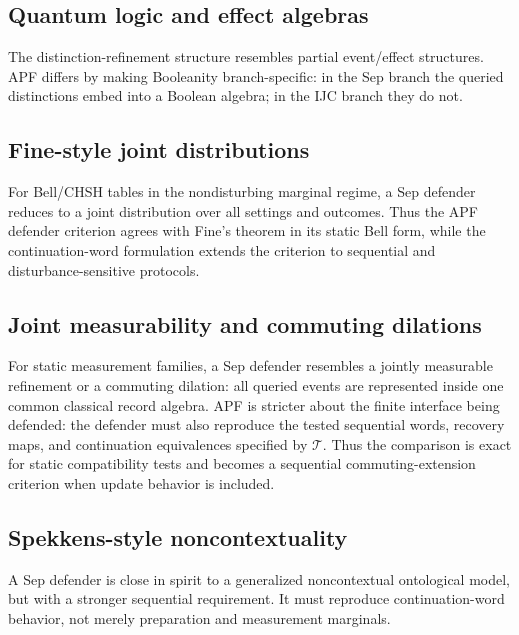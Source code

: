 \documentclass[11pt]{article}
\begin{document}
\subsection*{Quantum logic and effect algebras}
The distinction-refinement structure resembles partial event/effect structures.  APF differs by making Booleanity branch-specific: in the Sep branch the queried distinctions embed into a Boolean algebra; in the IJC branch they do not.

\subsection*{Fine-style joint distributions}
For Bell/CHSH tables in the nondisturbing marginal regime, a Sep defender reduces to a joint distribution over all settings and outcomes.  Thus the APF defender criterion agrees with Fine's theorem in its static Bell form, while the continuation-word formulation extends the criterion to sequential and disturbance-sensitive protocols.

\subsection*{Joint measurability and commuting dilations}
For static measurement families, a Sep defender resembles a jointly measurable refinement or a commuting dilation: all queried events are represented inside one common classical record algebra.  APF is stricter about the finite interface being defended: the defender must also reproduce the tested sequential words, recovery maps, and continuation equivalences specified by $\mathcal T$.  Thus the comparison is exact for static compatibility tests and becomes a sequential commuting-extension criterion when update behavior is included.

\subsection*{Spekkens-style noncontextuality}

A Sep defender is close in spirit to a generalized noncontextual ontological model, but with a stronger sequential requirement.  It must reproduce continuation-word behavior, not merely preparation and measurement marginals.
\end{document}
